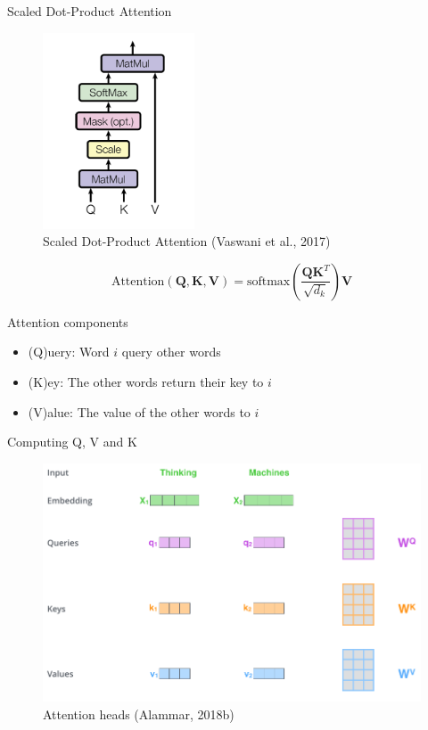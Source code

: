 \documentclass[10pt]{beamer}
\begin{document}
\begin{frame}{Scaled Dot-Product Attention}

\begin{figure}[h]
\centering
\includegraphics[width=0.4\textwidth]{fig/Vaswani_2_scaled_dot.png}
\caption{Scaled Dot-Product Attention (Vaswani et al., 2017)}
\end{figure}
\[
\text{Attention}(\mathbf{Q},\mathbf{K},\mathbf{V}) = \text{softmax}\left(\frac{\mathbf{Q} \mathbf{K}^T}{\sqrt {d_k}}\right) \mathbf{V}
\]

\end{frame}


\begin{frame}{Attention components}

\begin{itemize}
\item (Q)uery: Word $i$ query other words
\item (K)ey: The other words return their key to $i$
\item (V)alue: The value of the other words to $i$
\end{itemize}
\end{frame}


\begin{frame}{Computing Q, V and K}

\begin{figure}[h]
\centering
\includegraphics[width=1\textwidth]{fig/alammar_transformer_self_attention_vectors.png}
\caption{Attention heads (Alammar, 2018b)}
\end{figure}

\end{frame}
\end{document}
